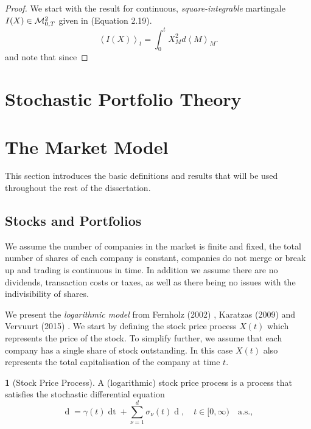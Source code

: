 \documentclass[british]{amsart}
\numberwithin{equation}{section}
\numberwithin{figure}{section}
\theoremstyle{plain}
\theoremstyle{definition}
\newtheorem{defn}[thm]{\protect\definitionname}
\theoremstyle{plain}
\theoremstyle{plain}
\theoremstyle{plain}
\theoremstyle{remark}
\theoremstyle{plain}
\providecommand{\definitionname}{Definition}
\renewcommand{\d}[1]{\mathop{\mathrm{d}{#1}}}
\newcommand{\ranget}{t\in[0,\infty)}
\newcommand{\almostsurely}{\text{a.s.}}
\begin{document}
\begin{proof}
	We start with the result for continuous, \textit{square-integrable} martingale 
	$I(X) \in \mathcal{M}^{2}_{0,T}$ given in \cite{shreve2012} (Equation 2.19).
	\begin{equation*}
		\left<I(X)\right>_{t} = \int_{0}^{t} X_{M}^2 d\left<M\right>_{M}.
	\end{equation*}
	and note that since 
\end{proof}

\section{Stochastic Portfolio Theory}

\section{The Market Model}

This section introduces the basic definitions and results that will be used 
throughout the rest of the dissertation.

\subsection{Stocks and Portfolios}

We assume the number of companies in the market is finite and fixed,
the total number of shares of each company is constant, companies
do not merge or break up and trading is continuous in time. In addition
we assume there are no dividends, transaction costs or taxes, as well as there
being no issues with the indivisibility of shares. 

We present the \textit{logarithmic model} from Fernholz (2002) 
\cite{fernholz2002}, Karatzas (2009) \cite{fernholz2009} and Vervuurt (2015)
\cite{vervuurt2015}. We start by defining the stock price process $X(t)$
which represents the price of the stock. To simplify further, we assume that
each company has a single share of stock outstanding. In this case $X(t)$ also
represents the total capitalisation of the company at time $t$.

\begin{defn} [Stock Price Process] 
	\label{def:logpriceprocess}
	A (logarithmic) stock price process is a process that satisfies the stochastic 
	differential equation
	\begin{equation} 
		\label{eq:stockpriceprocess}
		\d{\log{X(t)}} = 
			\gamma(t)\d{t} + 
			\sum_{\nu=1}^{d} \sigma_{\nu}(t){\d{W_{\nu}(t)}}, 
		\quad \ranget
		\quad \almostsurely,
	\end{equation}
\end{defn}
\end{document}
